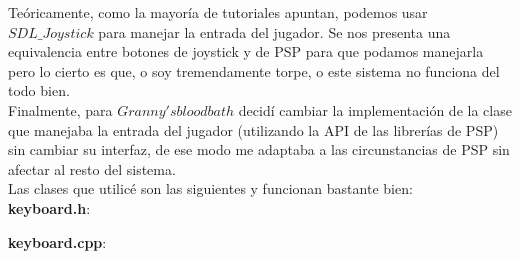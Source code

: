 Teóricamente, como la mayoría de tutoriales apuntan, podemos usar
$SDL\_Joystick$ para manejar la entrada del jugador. Se nos presenta una equivalencia
entre botones de joystick y de PSP para que podamos manejarla pero lo cierto
es que, o soy tremendamente torpe, o este sistema no funciona del todo bien.\\

Finalmente, para $Granny's bloodbath$ decidí cambiar la implementación 
de la clase que manejaba la entrada del jugador (utilizando la API de las librerías de PSP) 
sin cambiar su interfaz, de ese modo me adaptaba a las circunstancias de PSP sin
afectar al resto del sistema.\\

Las clases que utilicé son las siguientes y funcionan bastante bien:\\

\textbf{keyboard.h}:



\textbf{keyboard.cpp}:



